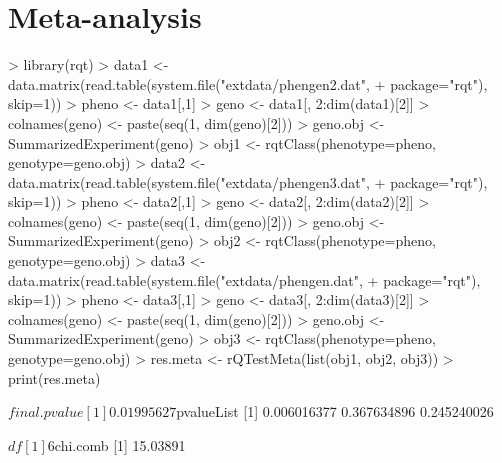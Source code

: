 \documentclass{article}
\begin{document}
\section{Meta-analysis}

\begin{Schunk}
\begin{Sinput}
> library(rqt)
> data1 <- data.matrix(read.table(system.file("extdata/phengen2.dat",
+                                             package="rqt"), skip=1))
> pheno <- data1[,1]
> geno <- data1[, 2:dim(data1)[2]]
> colnames(geno) <- paste(seq(1, dim(geno)[2]))
> geno.obj <- SummarizedExperiment(geno)
> obj1 <- rqtClass(phenotype=pheno, genotype=geno.obj)
> data2 <- data.matrix(read.table(system.file("extdata/phengen3.dat",
+                                             package="rqt"), skip=1))
> pheno <- data2[,1]
> geno <- data2[, 2:dim(data2)[2]]
> colnames(geno) <- paste(seq(1, dim(geno)[2]))
> geno.obj <- SummarizedExperiment(geno)
> obj2 <- rqtClass(phenotype=pheno, genotype=geno.obj)
> data3 <- data.matrix(read.table(system.file("extdata/phengen.dat",
+                                             package="rqt"), skip=1))
> pheno <- data3[,1]
> geno <- data3[, 2:dim(data3)[2]]
> colnames(geno) <- paste(seq(1, dim(geno)[2]))
> geno.obj <- SummarizedExperiment(geno)
> obj3 <- rqtClass(phenotype=pheno, genotype=geno.obj)
> res.meta <- rQTestMeta(list(obj1, obj2, obj3))
> print(res.meta)
\end{Sinput}
\begin{Soutput}
$final.pvalue
[1] 0.01995627

$pvalueList
[1] 0.006016377 0.367634896 0.245240026

$df
[1] 6

$chi.comb
[1] 15.03891
\end{Soutput}
\end{Schunk}
\end{document}

